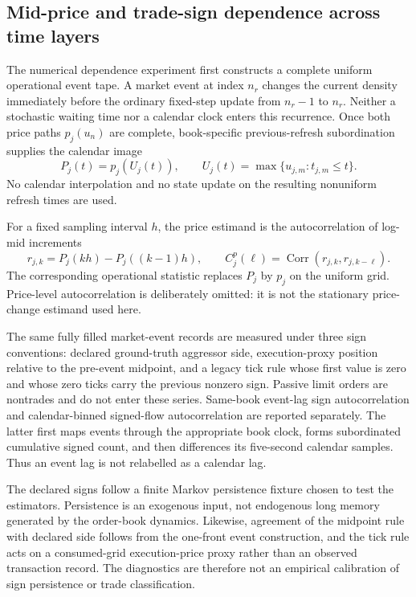 
\subsection{Mid-price and trade-sign dependence across time layers}
\label{app:dependence-diagnostics}

The numerical dependence experiment first constructs a complete uniform
operational event tape.  A market event at index $n_r$ changes the current
density immediately before the ordinary fixed-step update from $n_r-1$ to
$n_r$.  Neither a stochastic waiting time nor a calendar clock enters this
recurrence.  Once both price paths $p_j(u_n)$ are complete, book-specific
previous-refresh subordination supplies the calendar image
\begin{equation}
  P_j(t)=p_j\!\left(U_j(t)\right),
  \qquad
  U_j(t)=\max\{u_{j,m}:t_{j,m}\leq t\}.
\end{equation}
No calendar interpolation and no state update on the resulting nonuniform
refresh times are used.

For a fixed sampling interval $h$, the price estimand is the autocorrelation
of log-mid increments
\begin{equation}
  r_{j,k}=P_j(kh)-P_j((k-1)h),
  \qquad
  C^{p}_{j}(\ell)=\operatorname{Corr}(r_{j,k},r_{j,k-\ell}).
\end{equation}
The corresponding operational statistic replaces $P_j$ by $p_j$ on the
uniform grid.  Price-level autocorrelation is deliberately omitted: it is not
the stationary price-change estimand used here.

The same fully filled market-event records are measured under three sign
conventions: declared ground-truth aggressor side, execution-proxy position
relative to the pre-event midpoint, and a legacy tick rule whose first value
is zero and whose zero ticks carry the previous nonzero sign.  Passive limit
orders are nontrades and do not enter these series.  Same-book event-lag sign
autocorrelation and calendar-binned signed-flow autocorrelation are reported
separately.  The latter first maps events through the appropriate book clock,
forms subordinated cumulative signed count, and then differences its
five-second calendar samples.  Thus an event lag is not relabelled as a
calendar lag.

The declared signs follow a finite Markov persistence fixture chosen to test
the estimators.  Persistence is an exogenous input, not endogenous long memory
generated by the order-book dynamics.  Likewise, agreement of the midpoint
rule with declared side follows from the one-front event construction, and the
tick rule acts on a consumed-grid execution-price proxy rather than an observed
transaction record.  The diagnostics are therefore not an empirical
calibration of sign persistence or trade classification.

